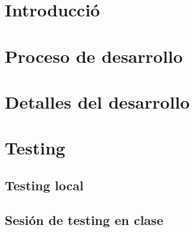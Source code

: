 \section{Introducció}


\newpage
\section{Proceso de desarrollo}


\newpage
\section{Detalles del desarrollo}

\newpage
\section{Testing}
\subsection{Testing local}



\newpage
\subsection{Sesión de testing en clase}



